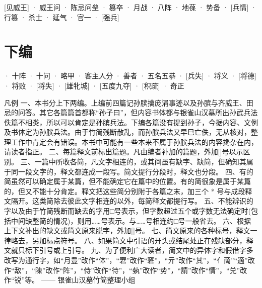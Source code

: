 \documentclass[12pt,UTF8]{ctexbook}
\begin{document}
[见威王]
· 威王问
· 陈忌问垒
· 篡卒
· 月战
· 八阵
· 地葆
· 势备
· [兵情]
· 行篡
· 杀士
· 延气
· 官一
· [强兵]
\part{下编}
· 十阵
· 十问
· 略甲
· 客主人分
· 善者
· 五名五恭
· [兵失]
· 将义
· [将德]
· 将败
· [将失]
· [雄牝城]
· [五度九夺]
· [积疏]
· 奇正

凡例
一、本书分上下两编。上编前四篇记孙膑擒庞涓事迹以及孙膑与齐威王、田忌的问答。其它各篇篇首都称“孙子曰”，但内容书体都与银雀山汉墓所出孙武兵法佚篇不相类，所以可以肯定是孙膑兵法。下编各篇没有提到孙子，今据内容、文例及书体定为孙膑兵法。由于竹简残断散乱，而孙膑兵法又早巳亡佚，无从核对，整理工作中肯定会有错误。本书中可能有一些本来不属于孙膑兵法的内容搀杂在内，请读者指正。
二、每篇释文前标出篇题。凡由编者补加的篇题，外加[]号以示区别。
三、一篇中所收各简，凡文字相连的，或其间虽有缺字、缺简，但确知其属于同一段文字的，释文都连成一段写。简文提行分段时，释文也分段。
四、有的简虽然可以确定属于某篇，但不能确定它在篇中的位置。有的简很象是属于某篇的，但又不能十分肯定。释文把这些简分别附于各篇之末，加三个 * 号与成段释文隔开。这类简除去彼此文字相连的以外，每简释文都提行写。
五、不能辨识的字以及由于竹简残断而缺去的字用□号表示，但字数超过五个或字数无法确定时(包括中间缺整简的情况)，则用……号表示。与……号相连约□号一般省去。
六、根据上下文补出的缺文或简文原来脱字，外加[]号。
七、简文原来的各种标号，释文一律略去，另加标点符号。
八、如果简文中引语的开头或结尾处正在残缺部分，释文就只标下引号或上引号。
九、为了便利广大读者，简文中的异体字和假借字多改写为通行字，如“{月豊}”改作“体”，“宭”改作“窘”，“亓”改作“其”，“{亻啇}”“適”改作“敌”，“陳”改作“阵”，“侍”改作“待”，“埶”改作“势”，“請”改作“情”，“兑”改作“锐”等。
—— 银雀山汉墓竹简整理小组
\end{document}
